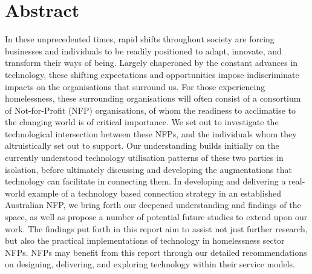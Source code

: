 \chapter{Abstract}

In these unprecedented times, rapid shifts throughout society are forcing businesses and individuals to be readily positioned to adapt, innovate, and transform their ways of being. Largely chaperoned by the constant advances in technology, these shifting expectations and opportunities impose indiscriminate impacts on the organisations that surround us. For those experiencing homelessness, these surrounding organisations will often consist of a consortium of Not-for-Profit (NFP) organisations, of whom the readiness to acclimatise to the changing world is of critical importance. We set out to investigate the technological intersection between these NFPs, and the individuals whom they altruistically set out to support. Our understanding builds initially on the currently understood technology utilisation patterns of these two parties in isolation, before ultimately discussing and developing the augmentations that technology can facilitate in connecting them. In developing and delivering a real-world example of a technology based connection strategy in an established Australian NFP, we bring forth our deepened understanding and findings of the space, as well as propose a number of potential future studies to extend upon our work. The findings put forth in this report aim to assist not just further research, but also the practical implementations of technology in homelessness sector NFPs. NFPs may benefit from this report through our detailed recommendations on designing, delivering, and exploring technology within their service models.